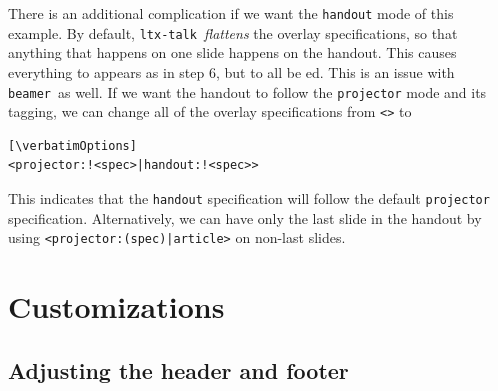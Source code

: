 \documentclass{ltugboat}
\newcommand{\verbatimOptions}{%
 \IfDocumentMetadataT{setup-code=}\small\makevmeta}
\newcommand{\beamer}{\texttt{beamer}}
\newcommand{\ltxtalk}{\texttt{ltx-talk}}
\begin{document}
There is an additional complication if we want
the \texttt{handout} mode of this example.
By default, \ltxtalk\ \emph{flattens} the overlay specifications,
so that anything that happens on one slide happens on the handout.
This causes everything to appears as in step 6, but to all be ed.
This is an issue with \beamer\ as well.
If we want the handout to follow the \texttt{projector} mode and its tagging,
we can change all of the overlay specifications from \texttt{<>}
to
\begin{verbatim}[\verbatimOptions]
<projector:!<spec>|handout:!<spec>>
\end{verbatim}
This indicates that the \texttt{handout} specification will follow
the default \texttt{projector} specification.
Alternatively, we can have only the last slide in the handout by using
\verb#<projector:(spec)|article>#
on non-last slides.


\section{Customizations}

\subsection{Adjusting the header and footer}
\end{document}
